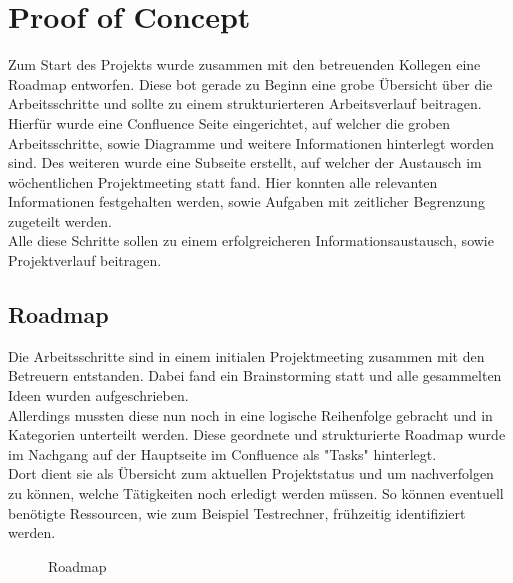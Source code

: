 
\section{Proof of Concept}
\label{section:poc}
Zum Start des Projekts wurde zusammen mit den betreuenden Kollegen eine Roadmap entworfen.
Diese bot gerade zu Beginn eine grobe Übersicht über die Arbeitsschritte und sollte zu einem strukturierteren Arbeitsverlauf beitragen.\\

Hierfür wurde eine Confluence Seite eingerichtet, auf welcher die groben Arbeitsschritte, sowie Diagramme und weitere Informationen hinterlegt worden sind.
Des weiteren wurde eine Subseite erstellt, auf welcher der Austausch im wöchentlichen Projektmeeting statt fand.
Hier konnten alle relevanten Informationen festgehalten werden, sowie Aufgaben mit zeitlicher Begrenzung zugeteilt werden.\\

Alle diese Schritte sollen zu einem erfolgreicheren Informationsaustausch, sowie Projektverlauf beitragen.


\subsection{Roadmap}
\label{section:roadmap}
Die Arbeitsschritte sind in einem initialen Projektmeeting zusammen mit den Betreuern entstanden.
Dabei fand ein Brainstorming statt und alle gesammelten Ideen wurden aufgeschrieben.\\

Allerdings mussten diese nun noch in eine logische Reihenfolge gebracht und in Kategorien unterteilt werden.
Diese geordnete und strukturierte Roadmap wurde im Nachgang auf der Hauptseite im Confluence als "Tasks" hinterlegt.\\

Dort dient sie als Übersicht zum aktuellen Projektstatus und um nachverfolgen zu können, welche Tätigkeiten noch erledigt werden müssen.
So können eventuell benötigte Ressourcen, wie zum Beispiel Testrechner, frühzeitig identifiziert werden.\\

\begin{figure}[H]
	\centering	
	\caption{Roadmap}
	\label{fig:roadmap}
\end{figure}

